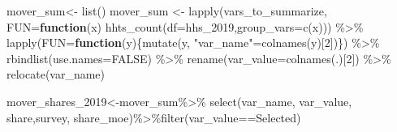 \documentclass[
]{article}
\newenvironment{Shaded}{\begin{snugshade}}{\end{snugshade}}
\newcommand{\AttributeTok}[1]{\textcolor[rgb]{0.77,0.63,0.00}{#1}}
\newcommand{\ConstantTok}[1]{\textcolor[rgb]{0.00,0.00,0.00}{#1}}
\newcommand{\ControlFlowTok}[1]{\textcolor[rgb]{0.13,0.29,0.53}{\textbf{#1}}}
\newcommand{\DecValTok}[1]{\textcolor[rgb]{0.00,0.00,0.81}{#1}}
\newcommand{\FunctionTok}[1]{\textcolor[rgb]{0.00,0.00,0.00}{#1}}
\newcommand{\NormalTok}[1]{#1}
\newcommand{\OtherTok}[1]{\textcolor[rgb]{0.56,0.35,0.01}{#1}}
\newcommand{\SpecialCharTok}[1]{\textcolor[rgb]{0.00,0.00,0.00}{#1}}
\newcommand{\StringTok}[1]{\textcolor[rgb]{0.31,0.60,0.02}{#1}}
\begin{document}
\begin{Shaded}
\begin{Highlighting}[]
\NormalTok{mover\_sum}\OtherTok{\textless{}{-}} \FunctionTok{list}\NormalTok{()}
\NormalTok{mover\_sum }\OtherTok{\textless{}{-}} \FunctionTok{lapply}\NormalTok{(vars\_to\_summarize, }\AttributeTok{FUN=}\ControlFlowTok{function}\NormalTok{(x) }\FunctionTok{hhts\_count}\NormalTok{(}\AttributeTok{df=}\NormalTok{hhs\_2019,}\AttributeTok{group\_vars=}\FunctionTok{c}\NormalTok{(x))) }\SpecialCharTok{\%\textgreater{}\%}
    \FunctionTok{lapply}\NormalTok{(}\AttributeTok{FUN=}\ControlFlowTok{function}\NormalTok{(y)\{}\FunctionTok{mutate}\NormalTok{(y, }\StringTok{"var\_name"}\OtherTok{=}\FunctionTok{colnames}\NormalTok{(y)[}\DecValTok{2}\NormalTok{])\}) }\SpecialCharTok{\%\textgreater{}\%} \FunctionTok{rbindlist}\NormalTok{(}\AttributeTok{use.names=}\ConstantTok{FALSE}\NormalTok{) }\SpecialCharTok{\%\textgreater{}\%} 
    \FunctionTok{rename}\NormalTok{(}\AttributeTok{var\_value=}\FunctionTok{colnames}\NormalTok{(.)[}\DecValTok{2}\NormalTok{]) }\SpecialCharTok{\%\textgreater{}\%} \FunctionTok{relocate}\NormalTok{(var\_name)}

\NormalTok{mover\_shares\_2019}\OtherTok{\textless{}{-}}\NormalTok{mover\_sum}\SpecialCharTok{\%\textgreater{}\%} \FunctionTok{select}\NormalTok{(var\_name, var\_value, share,survey, share\_moe)}\SpecialCharTok{\%\textgreater{}\%}\FunctionTok{filter}\NormalTok{(var\_value}\SpecialCharTok{==}\StringTok{\textquotesingle{}Selected\textquotesingle{}}\NormalTok{)         }
\end{Highlighting}
\end{Shaded}
\end{document}
